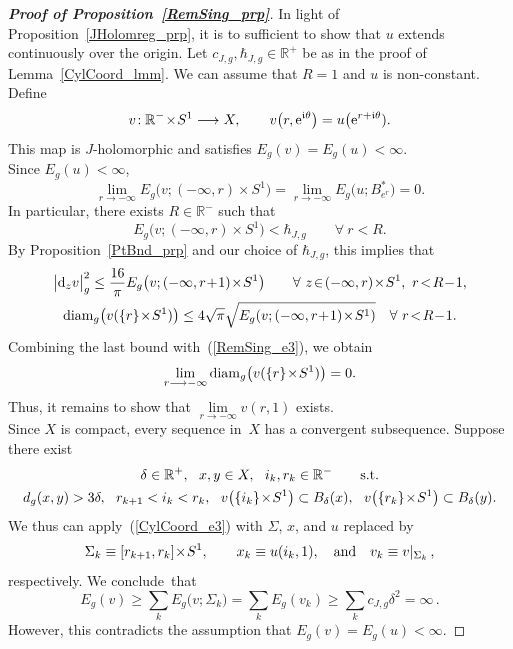 \documentclass[11pt]{article}
\numberwithin{equation}{section}
\theoremstyle{definition}
\def\BE#1{\begin{equation}\label{#1}}
\def\EE{\end{equation}}
\def\eref#1{(\ref{#1})}
\def\lra{\longrightarrow}
\def\fI{\mathfrak i}
\def\R{\mathbb R}
\def\de{\delta}
\def\th{\theta}
\def\Si{\Sigma}
\def\i{\infty}
\def\diam{\textnormal{diam}}
\def\nd{\textnormal{d}}
\def\ne{\textnormal{e}}
\begin{document}
\begin{proof}[{\bf\emph{Proof of Proposition~\ref{RemSing_prp}}}]
In light of Proposition~\ref{JHolomreg_prp},  
it is to sufficient to show that $u$ extends continuously over the origin.  
Let $c_{J,g},\hbar_{J,g}\!\in\!\R^+$ be as in the proof of Lemma~\ref{CylCoord_lmm}.
We can assume that $R\!=\!1$ and $u$ is non-constant.
Define
$$v\!: \R^-\!\times\!S^1\lra X, \qquad v\big(r,\ne^{\fI\th}\big)=u\big(\ne^{r+\fI\th}).$$
This map is $J$-holomorphic and satisfies $E_g(v)\!=\!E_g(u)\!<\!\i$.\\

\noindent
Since $E_g(u)\!<\!\i$, 
\BE{RemSing_e3}\lim_{r\lra-\i}\!\!E_g\big(v;(-\i,r)\!\times\!S^1\big)
=\lim_{r\lra-\i}\!\!E_g\big(u;B_{e^r}^*\big)=0.\EE
In particular, there exists $R\!\in\!\R^-$ such that 
$$E_g\big(v;(-\i,r)\!\times\!S^1\big)<\hbar_{J,g} \qquad\forall~r\!<\!R.$$
By Proposition~\ref{PtBnd_prp} and our choice of $\hbar_{J,g}$, this implies that 
\begin{gather*}
\big|\nd_zv\big|_g^2\le \frac{16}{\pi}E_g\big(v;(-\i,r\!+\!1)\!\times\!S^1\big) 
\qquad\forall~z\!\in\!(-\i,r)\!\times\!S^1,~r\!<\!R\!-\!1,\\
\diam_g\big(v(\{r\}\!\times\!S^1)\big)\le4\sqrt{\pi}
\sqrt{E_g(v;(-\i,r\!+\!1)\!\times\!S^1)}
\quad\forall~r\!<\!R\!-\!1.
\end{gather*}
Combining the last bound with~\eref{RemSing_e3}, we obtain
$$\lim_{r\lra-\i}\diam_g\big(v(\{r\}\!\times\!S^1)\big)=0.$$
Thus, it remains to show that $\lim\limits_{r\lra-\i}\!v(r,1)$ exists.\\

\noindent 
Since $X$ is compact, every sequence in~$X$ has a convergent subsequence.
Suppose there exist
\begin{gather*}
\de\in\R^+,~~x,y\in X,~~i_k,r_k\in\R^- \qquad\hbox{s.t.}\\
d_g(x,y)>3\de,~~
r_{k+1}<i_k<r_k,~~ v\big(\{i_k\}\!\times\!S^1\big)\subset B_{\de}(x),
~~ v\big(\{r_k\}\!\times\!S^1\big)\subset B_{\de}(y).
\end{gather*}
We thus can apply~\eref{CylCoord_e3} with $\Si$, $x$, and $u$ replaced by  
$$\Si_k\equiv[r_{k+1},r_k]\!\times\!S^1,\qquad x_k\equiv u(i_k,1),
\quad\hbox{and}\quad v_k\equiv v|_{\Si_k}\,,$$
respectively.
We conclude~that
$$E_g(v)\ge \sum_kE_g\big(v;\Si_k\big) = \sum_kE_g(v_k)
\ge \sum_k c_{J,g}\de^2=\i\,.$$
However, this contradicts the assumption that $E_g(v)\!=\!E_g(u)\!<\!\i$.
\end{proof}
\end{document}
